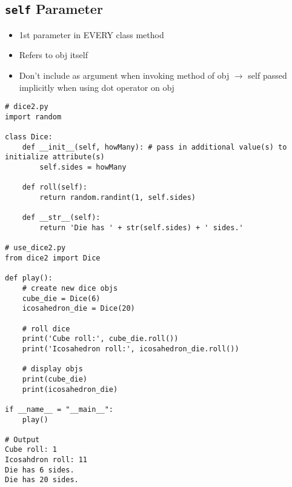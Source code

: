 \documentclass{article}
\begin{document}
\subsection{\texttt{self} Parameter}
    \begin{multicols}{2}
        \begin{itemize}
            \item 1st parameter in EVERY class method
            \item Refers to obj itself
            \item Don't include as argument when invoking method of obj $\rightarrow$ self passed implicitly when using dot operator on obj
        \end{itemize}
    \end{multicols}
\vspace{-2em}
\begin{lstlisting}
# dice2.py
import random

class Dice:
    def __init__(self, howMany): # pass in additional value(s) to initialize attribute(s)
        self.sides = howMany
    
    def roll(self):
        return random.randint(1, self.sides)
    
    def __str__(self):
        return 'Die has ' + str(self.sides) + ' sides.'

# use_dice2.py
from dice2 import Dice

def play():
    # create new dice objs
    cube_die = Dice(6)
    icosahedron_die = Dice(20)
    
    # roll dice
    print('Cube roll:', cube_die.roll())
    print('Icosahedron roll:', icosahedron_die.roll())
    
    # display objs
    print(cube_die)
    print(icosahedron_die)

if __name__ = "__main__":
    play()

# Output
Cube roll: 1
Icosahdron roll: 11
Die has 6 sides.
Die has 20 sides.
\end{lstlisting}

\end{document}
